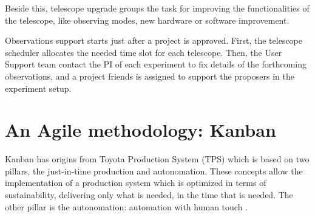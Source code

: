 \documentclass[a4paper]{spie}  %
\begin{document}
Beside this, telescope upgrade groups the task for improving the functionalities of the telescope, like observing modes, new hardware or software improvement.


Observations support starts just after a project is approved. First,  the telescope scheduler allocates the needed time slot for each telescope. Then, the User Support team contact the PI of each experiment to fix details of the forthcoming observations, and a project friends is assigned to support the proposers in the experiment setup. 

\section{An Agile methodology: Kanban }
Kanban has origins from Toyota Production System (TPS) which is based on two pillars, the just-in-time production and autonomation. 
These  concepts allow the implementation of a production system which is optimized in terms of sustainability, delivering only what is needed, 
in the time that is needed.
The other pillar is  the autonomation:  automation with human touch . 
\end{document}
